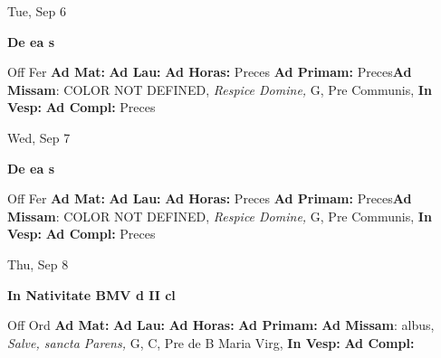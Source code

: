 \documentclass[10pt]{book}
\begin{document}
\begin{center}
\begin{minipage}{3.5in}
\vspace{2em}
\begin{center}Tue, Sep 6
\end{center}
\textbf{ \large De ea
\textnormal{\normalsize s}}

\begin{justify}Off Fer
\textbf{Ad Mat: }
\textbf{Ad Lau: }
\textbf{Ad Horas: }Preces
\textbf{Ad Primam: }Preces\textbf{Ad Missam}: COLOR NOT DEFINED, \textit{Respice Domine,} G, Pre Communis, 
\textbf{In Vesp: }
\textbf{Ad Compl: }Preces
\end{justify}
\end{minipage}
\end{center}

\begin{center}
\begin{minipage}{3.5in}
\vspace{2em}
\begin{center}Wed, Sep 7
\end{center}
\textbf{ \large De ea
\textnormal{\normalsize s}}

\begin{justify}Off Fer
\textbf{Ad Mat: }
\textbf{Ad Lau: }
\textbf{Ad Horas: }Preces
\textbf{Ad Primam: }Preces\textbf{Ad Missam}: COLOR NOT DEFINED, \textit{Respice Domine,} G, Pre Communis, 
\textbf{In Vesp: }
\textbf{Ad Compl: }Preces
\end{justify}
\end{minipage}
\end{center}

\begin{center}
\begin{minipage}{3.5in}
\vspace{2em}
\begin{center}Thu, Sep 8
\end{center}
\textbf{ \large In Nativitate BMV
\textnormal{\normalsize d II cl}}

\begin{justify}Off Ord
\textbf{Ad Mat: }
\textbf{Ad Lau: }
\textbf{Ad Horas: }
\textbf{Ad Primam: }\textbf{Ad Missam}: albus, \textit{Salve, sancta Parens,} G, C, Pre de B Maria Virg, 
\textbf{In Vesp: }
\textbf{Ad Compl: }
\end{justify}
\end{minipage}
\end{center}
\end{document}
